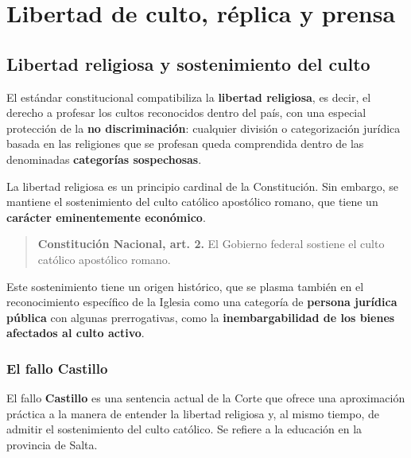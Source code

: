 \documentclass[12pt,oneside]{book}
\begin{document}
\tableofcontents
\clearpage


\chapter{Libertad de culto, réplica y prensa}

\section{Libertad religiosa y sostenimiento del culto}

El estándar constitucional compatibiliza la \textbf{libertad religiosa}, es decir, el derecho a profesar los cultos reconocidos dentro del país, con una especial protección de la \textbf{no discriminación}: cualquier división o categorización jurídica basada en las religiones que se profesan queda comprendida dentro de las denominadas \textbf{categorías sospechosas}.

La libertad religiosa es un principio cardinal de la Constitución. Sin embargo, se mantiene el sostenimiento del culto católico apostólico romano, que tiene un \textbf{carácter eminentemente económico}.

\begin{quote}
\textbf{Constitución Nacional, art. 2.} El Gobierno federal sostiene el culto católico apostólico romano.
\end{quote}

Este sostenimiento tiene un origen histórico, que se plasma también en el reconocimiento específico de la Iglesia como una categoría de \textbf{persona jurídica pública} con algunas prerrogativas, como la \textbf{inembargabilidad de los bienes afectados al culto activo}.

\subsection{El fallo Castillo}

El fallo \textbf{Castillo} es una sentencia actual de la Corte que ofrece una aproximación práctica a la manera de entender la libertad religiosa y, al mismo tiempo, de admitir el sostenimiento del culto católico. Se refiere a la educación en la provincia de Salta.
\end{document}
